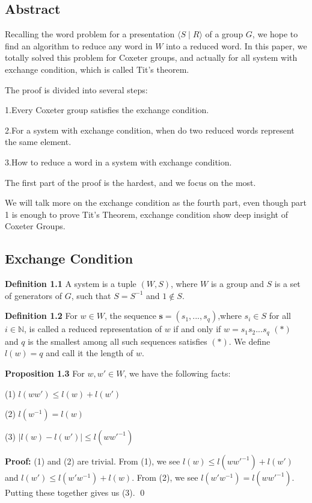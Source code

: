 \documentclass[../main.tex]{subfiles}
\begin{document}
\setcounter{subsection}{-1}
\subsection{Abstract}

Recalling the word problem for a presentation $\langle S\mid R\rangle$ of a group $G$, we hope to find an algorithm to reduce any word in $W$ into a reduced word. In this paper, we totally solved this problem for Coxeter groups, and actually for all system with exchange condition, which is called Tit's theorem.

\noindent The proof is divided into several steps:

1.Every Coxeter group satisfies the exchange condition.

2.For a system with exchange condition, when do two reduced words represent the same element.

3.How to reduce a word in a system with exchange condition.

The first part of the proof is the hardest, and we focus on the most.

We will talk more on the exchange condition as the fourth part, even though part 1 is enough to prove Tit's Theorem, exchange condition show deep insight of Coxeter Groups.

\subsection{Exchange Condition}
\textbf{Definition 1.1} A system is a tuple $(W,S)$, where $W$ is a group and $S$ is a set of generators of $G$, such that $S=S^{-1}$ and $1\notin S$.

\vspace{\baselineskip}
\noindent \textbf{Definition 1.2} For $w \in W$, the sequence $\mathbf{s}=(s_1,...,s_q)$,where $s_i \in S$ for all $i\in \mathbb{N}$, is called a reduced representation of $w$ if and only if $w=s_1s_2...s_q$ $(*)$ and $q$ is the smallest among all such sequences satisfies $(*)$. We define $l(w)=q$ and call it the length of $w$.

\vspace{\baselineskip}
\noindent \textbf{Proposition 1.3} For $w,w'\in W$, we have the following facts:

\indent (1) $l(ww')\le l(w)+l(w')$

\indent (2) $l(w^{-1}) = l(w)$

\indent (3) $|l(w)-l(w')| \le l(ww'^{-1})$

\noindent \textbf{Proof:} (1) and (2) are trivial. From (1), we see $l(w) \le l(ww'^{-1})+l(w')$ and $l(w') \le l(w'w^{-1})+l(w)$. From (2), we see $l(w'w^{-1})=l(ww'^{-1})$. Putting these together gives us (3). \qed
\end{document}
